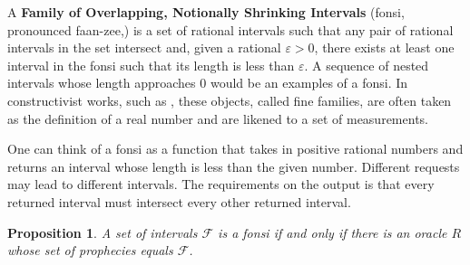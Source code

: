 \documentclass[12pt]{article}
\newtheorem{proposition}{Proposition}[section]
\begin{document}
 A \textbf{Family of Overlapping, Notionally Shrinking Intervals} (fonsi, pronounced faan-zee,) is a set of rational intervals such that any pair of rational intervals in the set intersect and, given a rational $\varepsilon >0$, there exists at least one interval in the fonsi such that its length is less than $\varepsilon$. A sequence of nested intervals whose length approaches $0$ would be an  examples of a fonsi. In constructivist works, such as \cite{bridger}, these objects, called fine families, are often taken as the definition of a real number and are likened to a set of measurements. 

One can think of a fonsi as a function that takes in positive rational numbers and returns an interval whose length is less than the given number. Different requests may lead to different intervals. The requirements on the output is that every returned interval must intersect every other returned interval. 

\begin{proposition}
    A set of intervals $\mathcal{F}$ is a fonsi if and only if there is an oracle $R$ whose set of prophecies equals $\mathcal{F}$.
\end{proposition}
\end{document}
